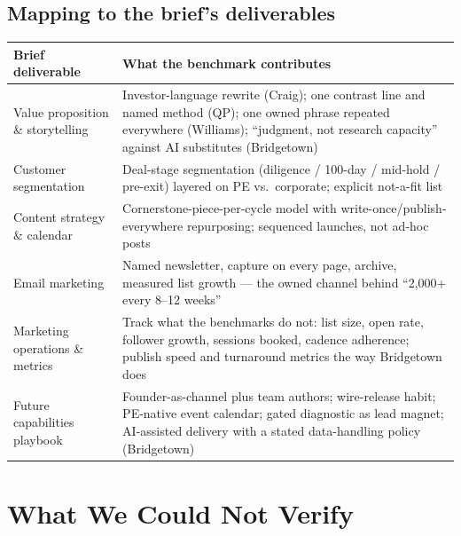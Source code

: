 \documentclass[11pt]{article}
\begin{document}
\subsection{Mapping to the brief's deliverables}
\begin{center}
\renewcommand{\arraystretch}{1.3}
\begin{tabular}{R{4.0cm} R{9.2cm}}
\toprule
\textbf{Brief deliverable} & \textbf{What the benchmark contributes} \\
\midrule
Value proposition \& storytelling & Investor-language rewrite (Craig); one contrast
line and named method (QP); one owned phrase repeated everywhere (Williams);
``judgment, not research capacity'' against AI substitutes (Bridgetown) \\
Customer segmentation & Deal-stage segmentation (diligence / 100-day / mid-hold /
pre-exit) layered on PE vs.\ corporate; explicit not-a-fit list \\
Content strategy \& calendar & Cornerstone-piece-per-cycle model with
write-once/publish-everywhere repurposing; sequenced launches, not ad-hoc posts \\
Email marketing & Named newsletter, capture on every page, archive, measured list
growth --- the owned channel behind ``2,000+ every 8--12 weeks'' \\
Marketing operations \& metrics & Track what the benchmarks do not: list size, open
rate, follower growth, sessions booked, cadence adherence; publish speed and
turnaround metrics the way Bridgetown does \\
Future capabilities playbook & Founder-as-channel plus team authors; wire-release
habit; PE-native event calendar; gated diagnostic as lead magnet; AI-assisted
delivery with a stated data-handling policy (Bridgetown) \\
\bottomrule
\end{tabular}
\end{center}

\section{What We Could Not Verify}\label{sec:unverified}
\end{document}
